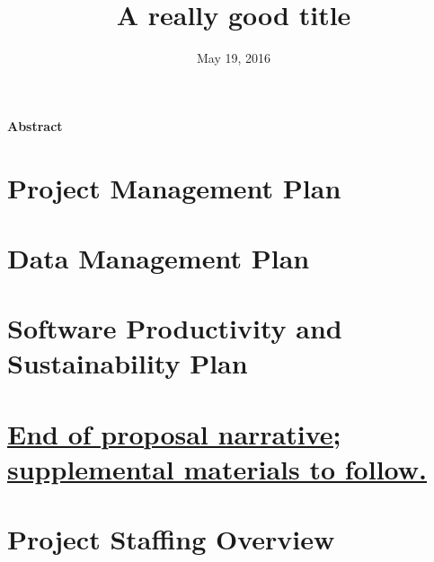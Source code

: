\documentclass{DOEproposal}
\institute{Oak Ridge National Laboratory}
\title{A really good title}
\date{May 19, 2016}
\renewcommand*{\maketitle}{}
\begin{document}
    \maketitle

    \renewcommand{\contentsname}{Table of Contents}
    \tableofcontents
    \newpage

    \begin{center}
        {\bf \Large Abstract}
    \end{center}
    
    \newpage

    \setcounter{page}{1}

    
    
    
    
    \section{Project Management Plan}
        \label{sec:management}
        

    \section{Data Management Plan}
        \label{sec:data_management}
        

    \section{Software Productivity and Sustainability Plan}
        \label{sec:software_sustainability}
        


    \vspace{1em}
    \section*{\underline{End of proposal narrative; supplemental materials to follow.}}
    \newpage


    \section{Project Staffing Overview}
        \label{sec:staffing}
        
    \newpage
\end{document}
